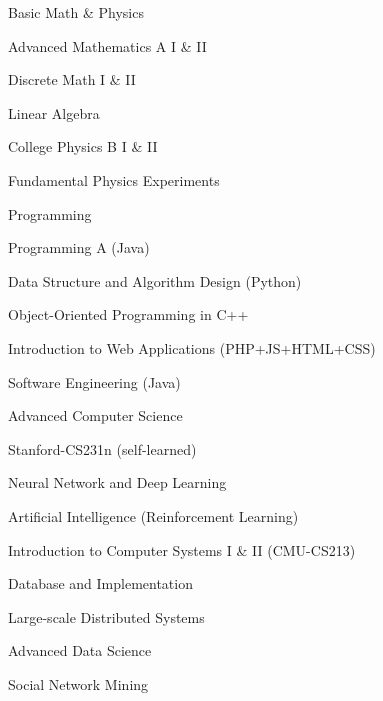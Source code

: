
\begin{cventries}

  \cventry
    {Basic Math \& Physics} %
    {} %
    {} %
    {} %
    {
      \begin{cvitems} %
        \item {Advanced Mathematics A I \& II}
        \item {Discrete Math I \& II}
        \item {Linear Algebra}
        \item {College Physics B I \& II}
        \item {Fundamental Physics Experiments}
      \end{cvitems}
    }

  \cventry
    {Programming} %
    {} %
    {} %
    {} %
    {
      \begin{cvitems} %
        \item {Programming A (Java) }
        \item {Data Structure and Algorithm Design (Python)}
        \item {Object-Oriented Programming in C++}
        \item {Introduction to Web Applications (PHP+JS+HTML+CSS) }
        \item {Software Engineering (Java) }
      \end{cvitems}
    }

\cventry
  {Advanced Computer Science} %
  {} %
  {} %
  {} %
  {
    \begin{cvitems} %
      \item {Stanford-CS231n (self-learned)}
      \item {Neural Network and Deep Learning}
      \item {Artificial Intelligence (Reinforcement Learning)}
      \item {Introduction to Computer Systems I \& II (CMU-CS213)}
      \item {Database and Implementation}
      \item {Large-scale Distributed Systems}
      \item {Advanced Data Science}
      \item {Social Network Mining}
    \end{cvitems}
  }


\end{cventries}

